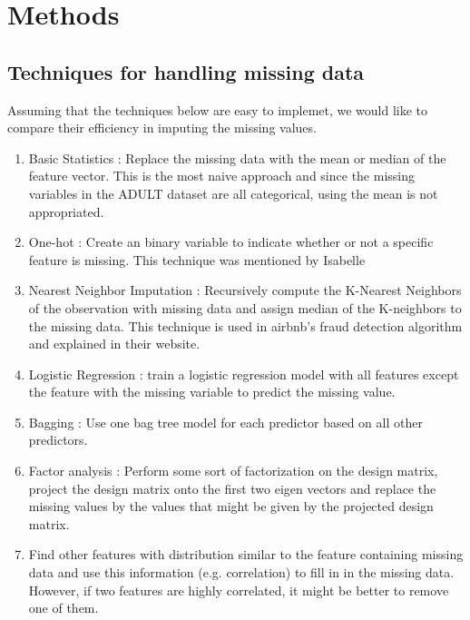 \documentclass[12pt]{article}
\begin{document}

\section{Methods}


\subsection{Techniques for handling missing data}
Assuming that the techniques below are easy to implemet, we would like to compare their efficiency in imputing the missing values.

\begin{enumerate}
\item Basic Statistics : Replace the missing data with the mean or median of the feature vector. This is the most naive approach and since the missing variables in the ADULT dataset are all categorical, using the mean is not appropriated.
\item One-hot : Create an binary variable to indicate whether or not a specific feature is missing. This technique was mentioned by Isabelle
\item Nearest Neighbor Imputation : Recursively compute the K-Nearest Neighbors of the observation with missing data and assign median of the K-neighbors to the missing data. This technique is used in airbnb's fraud detection algorithm and explained in their website.
\item Logistic Regression : train a logistic regression model with all features except the feature with the missing variable to predict the missing value.
\item Bagging : Use one bag tree model for each predictor based on all other
   predictors.
\item Factor analysis : Perform some sort of factorization on the design matrix, project the design matrix onto the first two eigen vectors and replace the missing values by the values that might be given by the projected design matrix.
\item Find other features with distribution similar to the feature containing missing data and use this information (e.g. correlation) to fill in in the missing data. However, if two features are highly correlated, it might be better to remove one of them.
\end{enumerate}
\end{document}
